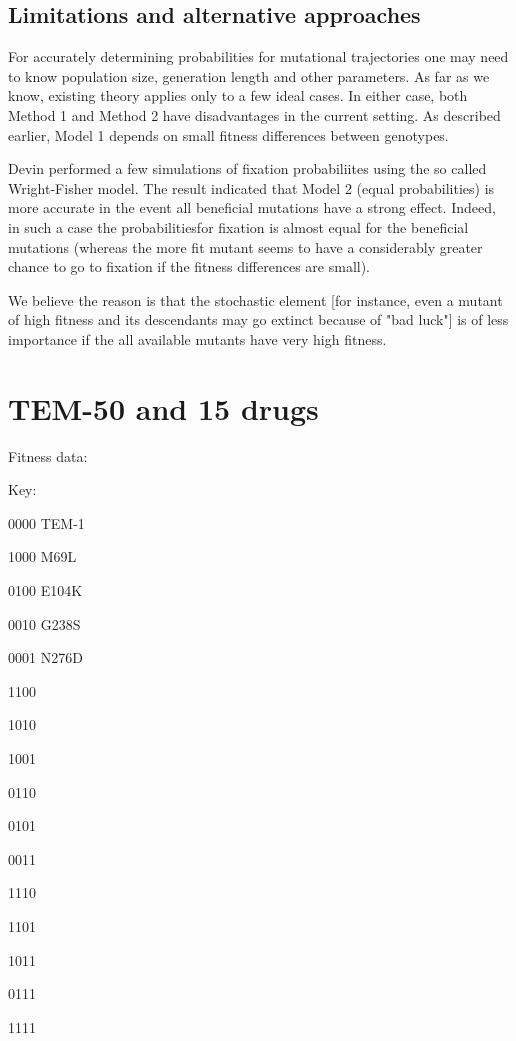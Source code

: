 \documentclass[12pt]{amsart}
\theoremstyle{plain}
\theoremstyle{definition}
\begin{document}
{\subsection{Limitations and alternative approaches}
For accurately determining probabilities for mutational trajectories one may need to know population size, generation length and other parameters. As far as we know, existing theory applies only to a few ideal cases. In either case, both Method 1 and Method 2 have disadvantages in the current setting.  As described earlier, Model 1 depends on small fitness differences between genotypes. 

Devin performed a few simulations of fixation probabiliites using the so called Wright-Fisher model. The result indicated that Model 2 (equal probabilities) is more accurate in the event all beneficial mutations
have a strong effect. Indeed, in such a  case the probabilitiesfor fixation is almost equal for the beneficial mutations
(whereas the more fit mutant seems to have a considerably greater chance to go to fixation if the fitness differences
are small).

We believe the reason is that the stochastic element [for instance, even a mutant of high fitness
and its descendants may go extinct because of "bad luck"] is of less importance if the
all available  mutants have very high fitness.

\newpage

\section{TEM-50 and 15 drugs}

Fitness data:

Key:

0000
TEM-1

1000
M69L

0100
E104K


0010
G238S

0001
N276D

1100

1010

1001

0110

0101

0011

1110

1101

1011

0111

1111

\bigskip

}
\end{document}
